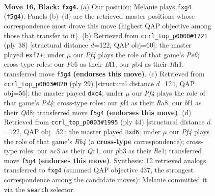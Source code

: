 \documentclass[11pt]{article}
\begin{document}
\begin{figure}[p]
\label{fig:thought-m29}
\end{figure}

\clearpage

\begin{figure}[p]\centering
\begin{subfigure}{0.46\textwidth}\centering
\resizebox{\linewidth}{!}{%
\newchessgame
\chessboard[
  setfen={rnb2rk1/ppp5/1n2p1p1/3pPp2/PP1P1PP1/1PN5/8/3QKBNR b K - 0 16},
  showmover=false,
  pgfstyle=straightmove, color=movearrow, markmove={f5-g4}
]}
\caption{}
\end{subfigure}\hfill
\begin{subfigure}{0.46\textwidth}\centering
\resizebox{\linewidth}{!}{%
\newchessgame
\chessboard[
  setfen={2r1nrk1/p3pp1p/4P1p1/q1p5/1p2P3/1Pb1BNN1/P1P3PP/1K1R1B1R w - - 0 20},
  showmover=false,
  pgfstyle=straightmove, color=movearrow, markmove={e6-f7}
]}
\caption{}
\end{subfigure}
\\[4pt]
\begin{subfigure}{0.46\textwidth}\centering
\resizebox{\linewidth}{!}{%
\newchessgame
\chessboard[
  setfen={r1bq1rk1/pp1n1p2/4p2p/3p2p1/2PP4/P2B1NP1/1P3PP1/R1Q1K2R b KQ - 0 15},
  showmover=false,
  pgfstyle=straightmove, color=movearrow, markmove={d5-c4}
]}
\caption{}
\end{subfigure}\hfill
\begin{subfigure}{0.46\textwidth}\centering
\resizebox{\linewidth}{!}{%
\newchessgame
\chessboard[
  setfen={r2q2k1/1p3p2/2pb1pp1/7p/pBPP4/1P1b1N1P/P4PP1/2Q1R1K1 w - - 2 23},
  showmover=false,
  pgfstyle=straightmove, color=movearrow, markmove={b4-d6}
]}
\caption{}
\end{subfigure}
\caption{\textbf{Move 16, Black: \texttt{fxg4}.} (a) Our position; Melanie plays \texttt{fxg4} (\texttt{f5g4}). Panels (b)--(d) are the retrieved master positions whose correspondence most drove this move (highest QAP objective among those that transfer to it). (b) Retrieved from \texttt{ccrl\_top\_p0000\#1721} (ply 38) [structural distance $d$=122, QAP obj=60]: the master played \texttt{exf7+}; under $\mu$ our \emph{Pf4} plays the role of that game's \emph{Pe6}; cross-type roles: our \emph{P}e6 as their \emph{B}f1, our \emph{p}b4 as their \emph{R}h1; transferred move \texttt{f5g4} \textbf{(endorses this move)}. (c) Retrieved from \texttt{ccrl\_top\_p0003\#820} (ply 29) [structural distance $d$=124, QAP obj=56]: the master played \texttt{dxc4}; under $\mu$ our \emph{Pf4} plays the role of that game's \emph{Pd4}; cross-type roles: our \emph{p}f4 as their \emph{R}a8, our \emph{b}f1 as their \emph{Q}d8; transferred move \texttt{f5g4} \textbf{(endorses this move)}. (d) Retrieved from \texttt{ccrl\_top\_p0003\#1995} (ply 44) [structural distance $d$=122, QAP obj=52]: the master played \texttt{Bxd6}; under $\mu$ our \emph{Pf4} plays the role of that game's \emph{Bb4} (a \textbf{cross-type} correspondence); cross-type roles: our \emph{n}c3 as their \emph{Q}c1, our \emph{p}b3 as their \emph{R}e1; transferred move \texttt{f5g4} \textbf{(endorses this move)}. Synthesis: 12 retrieved analogs transferred to \texttt{fxg4} (summed QAP objective 437, the strongest correspondence among the candidate moves); Melanie committed it via the \texttt{search} selector.}

\end{figure}
\end{document}

